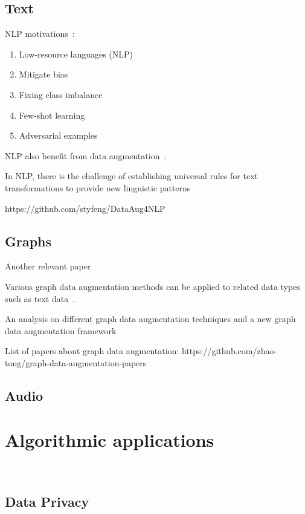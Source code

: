\documentclass[parskip=full]{scrartcl}
\begin{document}

\subsection{Text}

NLP motivations~\cite{feng2021survey}:

\begin{enumerate}
    \item Low-resource languages (NLP)
    \item Mitigate bias
    \item Fixing class imbalance
    \item Few-shot learning
    \item Adversarial examples
\end{enumerate}


NLP also benefit from data augmentation~\cite{feng2021survey}.

In NLP, there is the challenge of establishing universal rules for text
transformations to provide new linguistic patterns~\cite{bayer2022data}

https://github.com/styfeng/DataAug4NLP

\subsection{Graphs}


Another relevant paper~\cite{zhou2020data}

Various graph data augmentation methods can be applied to related data types
such as text data~\cite{shorten2021text}.


An analysis on different graph data augmentation techniques and a new graph
data augmentation framework~\citet{zhao2021data}

List of papers about graph data augmentation:
https://github.com/zhao-tong/graph-data-augmentation-papers

\subsection{Audio}

\section{Algorithmic applications}~\label{sec:algorithmic-applications}

\subsection{Data Privacy}~\label{sec:data-privacy}
\end{document}
